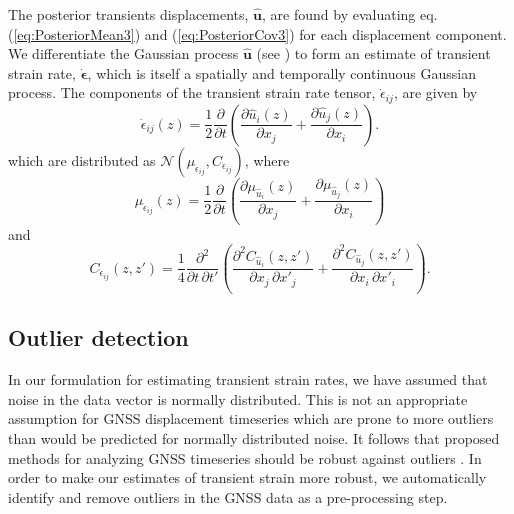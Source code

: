 \documentclass[10pt,a4paper]{article}
\begin{document}
The posterior transients displacements, $\hat{\bm{u}}$, are found by evaluating eq. (\ref{eq:PosteriorMean3}) and (\ref{eq:PosteriorCov3}) for each displacement component. We differentiate the Gaussian process $\hat{\bm{u}}$ (see \cite{Abrahamsen1997}) to form an estimate of transient strain rate, $\dot{\bm{\epsilon}}$, which is itself a spatially and temporally continuous Gaussian process. The components of the transient strain rate tensor, $\dot{\epsilon}_{ij}$, are given by
\begin{equation}\label{eq:StrainRate}
\dot{\epsilon}_{ij}(z) = \frac{1}{2} \frac{\partial}{\partial t} \left(
                                     \frac{\partial \hat{u}_i(z)}{\partial x_j} +  
                                     \frac{\partial \hat{u}_j(z)}{\partial x_i}\right).
\end{equation}
which are distributed as $\mathcal{N}(\mu_{\dot{\epsilon}_{ij}},C_{\dot{\epsilon}_{ij}})$, where
\begin{equation}\label{eq:StrainMean}
\mu_{\dot{\epsilon}_{ij}}(z) = \frac{1}{2}\frac{\partial}{\partial t}\left(
                               \frac{\partial \mu_{\hat{u}_i}(z)}{\partial x_j} + 
                               \frac{\partial \mu_{\hat{u}_j}(z)}{\partial x_i} \right)
\end{equation} 
and  
\begin{equation}\label{eq:StrainCov}
C_{\dot{\epsilon}_{ij}}(z,z') = \frac{1}{4} \frac{\partial^2}{\partial t \, \partial t'}\left(
                           \frac{\partial^2 C_{\hat{u}_i}(z,z')}{\partial x_j \, \partial x'_j} + 
                           \frac{\partial^2 C_{\hat{u}_j}(z,z')}{\partial x_i \, \partial x'_i} \right).
\end{equation} 

\subsection{Outlier detection}\label{sec:Outlier}
In our formulation for estimating transient strain rates, we have assumed that noise in the data vector is normally distributed. This is not an appropriate assumption for GNSS displacement timeseries which are prone to more outliers than would be predicted for normally distributed noise. It follows that proposed methods for analyzing GNSS timeseries should be robust against outliers \citep[e.g.,][]{Blewitt2016}. In order to make our estimates of transient strain more robust, we automatically identify and remove outliers in the GNSS data as a pre-processing step.
\end{document}
